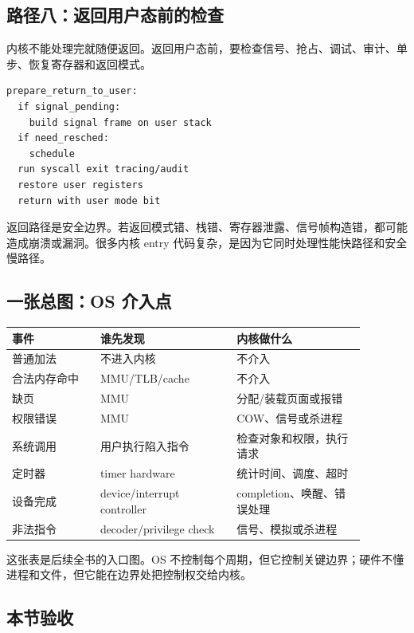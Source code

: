 \subsection{路径八：返回用户态前的检查}

内核不能处理完就随便返回。返回用户态前，要检查信号、抢占、调试、审计、单步、恢复寄存器和返回模式。

\begin{lstlisting}
prepare_return_to_user:
  if signal_pending:
    build signal frame on user stack
  if need_resched:
    schedule
  run syscall exit tracing/audit
  restore user registers
  return with user mode bit
\end{lstlisting}

返回路径是安全边界。若返回模式错、栈错、寄存器泄露、信号帧构造错，都可能造成崩溃或漏洞。很多内核 entry 代码复杂，是因为它同时处理性能快路径和安全慢路径。

\subsection{一张总图：OS 介入点}

\begin{longtable}{p{0.22\linewidth}p{0.34\linewidth}p{0.32\linewidth}}
\toprule
事件 & 谁先发现 & 内核做什么 \\
\midrule
普通加法 & 不进入内核 & 不介入 \\
合法内存命中 & MMU/TLB/cache & 不介入 \\
缺页 & MMU & 分配/装载页面或报错 \\
权限错误 & MMU & COW、信号或杀进程 \\
系统调用 & 用户执行陷入指令 & 检查对象和权限，执行请求 \\
定时器 & timer hardware & 统计时间、调度、超时 \\
设备完成 & device/interrupt controller & completion、唤醒、错误处理 \\
非法指令 & decoder/privilege check & 信号、模拟或杀进程 \\
\bottomrule
\end{longtable}

这张表是后续全书的入口图。OS 不控制每个周期，但它控制关键边界；硬件不懂进程和文件，但它能在边界处把控制权交给内核。

\subsection{本节验收}

